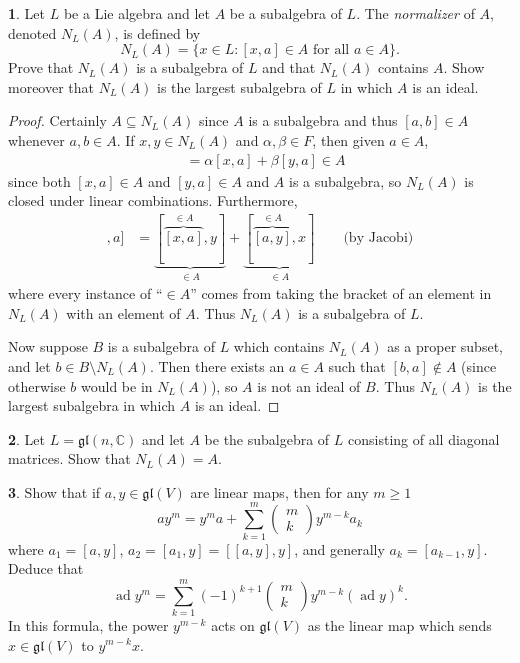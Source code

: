 \documentclass[12pt]{article}
\DeclareMathOperator{\ad}{ad}
\newcommand{\gl}{\mathfrak{gl}}
\theoremstyle{definition}
\newtheorem{ex}{}
\begin{document}
\begin{ex}
	Let $L$ be a Lie algebra and let $A$ be a subalgebra of $L$.
	The \textit{normalizer} of $A$, denoted $N_L(A)$, is defined by \begin{equation*}
		N_L(A) = \lbrace x \in L : [x,a] \in A \text{ for all } a \in A\rbrace.
	\end{equation*}
	Prove that $N_L(A)$ is a subalgebra of $L$ and that $N_L(A)$ contains $A$.
	Show moreover that $N_L(A)$ is the largest subalgebra of $L$ in which $A$ is an ideal.
\end{ex}
\begin{proof}
	Certainly $A \subseteq N_L(A)$ since $A$ is a subalgebra and thus $[a, b] \in A$ whenever $a, b \in A$.
	If $x, y \in N_L(A)$ and $\alpha, \beta \in F$, then given $a \in A$, \begin{align*}
		[\alpha x + \beta y, a] & = \alpha[x, a] + \beta[y, a] \in A
	\end{align*}
	since both $[x, a] \in A$ and $[y, a] \in A$ and $A$ is a subalgebra, so $N_L(A)$ is closed under linear combinations.
	Furthermore, \begin{align*}
    [[x, y], a] & = \underbrace{[\overbrace{[x, a]}^{\in A}, y]}_{\in A} + \underbrace{[\overbrace{[a, y]}^{\in A}, x]}_{\in A} \hspace{2em}\text{(by Jacobi)}
	\end{align*}
  where every instance of ``$\in A$'' comes from taking the bracket of an element in $N_L(A)$ with an element of $A$.
  Thus $N_L(A)$ is a subalgebra of $L$.

  Now suppose $B$ is a subalgebra of $L$ which contains $N_L(A)$ as a proper subset, and let $b \in B \setminus N_L(A)$.
  Then there exists an $a \in A$ such that $[b, a] \notin A$ (since otherwise $b$ would be in $N_L(A)$), so $A$ is not an ideal of $B$.
  Thus $N_L(A)$ is the largest subalgebra in which $A$ is an ideal.
\end{proof}

\begin{ex}
  Let $L = \gl(n, \mathbb{C})$ and let $A$ be the subalgebra of $L$ consisting of all diagonal matrices.
  Show that $N_L(A) = A$.
\end{ex}

\begin{ex}
  Show that if $a, y \in \gl(V)$ are linear maps, then for any $m \geq 1$ \begin{equation*}
    ay^m = y^m a + \sum_{k=1}^m \begin{pmatrix}m \\ k\end{pmatrix} y^{m-k}a_k
  \end{equation*}
  where $a_1 = [a,y]$, $a_2 = [a_1, y] = [[a,y],y]$, and generally $a_k = [a_{k-1},y]$.
  Deduce that \begin{equation*}
    \ad y^m = \sum_{k=1}^m (-1)^{k+1}\begin{pmatrix}m \\ k\end{pmatrix}y^{m-k}(\ad y)^k.
  \end{equation*}
  In this formula, the power $y^{m-k}$ acts on $\gl(V)$ as the linear map which sends $x \in \gl(V)$ to $y^{m-k}x$.
\end{ex}
\end{document}
